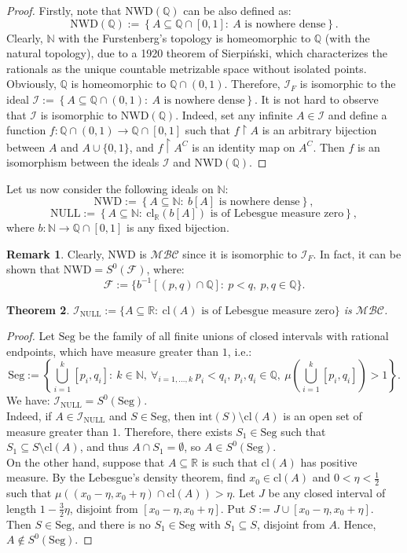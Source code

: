 \documentclass{amsart}
\newtheorem{thm}{Theorem}[section]
\theoremstyle{definition}
\newtheorem{remark}[thm]{Remark}
\newcommand{\N}{{\mathbb N}}
\newcommand{\R}{{\mathbb R}}
\newcommand{\Q}{{\mathbb Q}}
\newcommand{\I}{\mathcal I}
\newcommand{\MB}{S^0}
\newcommand{\MBC}{\mathcal{MBC}}
\newcommand{\Seg}{\mathrm{Seg}}
\newcommand{\NULL}{\mathrm{NULL}}
\newcommand{\NWD}{\mathrm{NWD}}
\newcommand{\INULL}{\I_\mathrm{NULL}}
\newcommand{\cl}{\mathrm{cl}}
\newcommand{\interior}{\mathrm{int}}
\begin{document}
\begin{proof}
Firstly, note that $\NWD(\Q)$ can be also defined as:
$$\NWD(\Q) := \left\{A\subseteq\mathbb{Q}\cap [0,1] :\ A \textrm{ is nowhere dense}\right\}.$$
Clearly, $\N$ with the Furstenberg's topology is homeomorphic to $\Q$ (with the natural topology), due to a 1920 theorem of Sierpi\'nski, which characterizes the rationals as the unique countable metrizable space without isolated points. Obviously, $\Q$ is homeomorphic to $\Q\cap (0,1)$. Therefore, $\I_F$ is isomorphic to the ideal $\I := \left\{A\subseteq\Q\cap (0,1) :\ A \textrm{ is nowhere dense}\right\}$. It is not hard to observe that $\I$ is isomorphic to $\NWD(\Q)$. Indeed, set any infinite $A\in\I$ and define a function $f \colon \Q\cap (0,1) \to \Q\cap [0,1]$ such that $f\upharpoonright A$ is an arbitrary bijection between $A$ and $A\cup\{0,1\}$, and $f\upharpoonright A^C$ is an identity map on $A^C$. Then $f$ is an isomorphism between the ideals $\I$ and $\NWD(\Q)$.
\end{proof}

Let us now consider the following ideals on $\N$:
$$\NWD :=\left\{A\subseteq\N :\ b[A] \textrm{ is nowhere dense}\right\},$$
$$\NULL :=\left\{A\subseteq\N :\ \cl_\R(b[A]) \textrm{ is of Lebesgue measure zero}\right\},$$
where $b\colon\N\to\Q\cap [0,1]$ is any fixed bijection.

\begin{remark}
Clearly, $\NWD$ is $\MBC$ since it is isomorphic to $\I_F$. In fact, it can be shown that $\NWD = \MB(\mathcal{F})$, where:
$$\mathcal{F} := \{b^{-1}[(p, q)\cap\Q] :\ p < q,\ p, q \in \Q\}.$$
\end{remark}

\begin{thm}
$\INULL := \{A \subseteq\R :\ \cl(A) \textrm{ is of Lebesgue measure zero}\}$ is $\MBC$.
\end{thm}

\begin{proof}
Let $\Seg$ be the family of all finite unions of closed intervals with rational endpoints, which have measure greater than $1$, i.e.:
$$\Seg := \left\{\bigcup_{i=1}^{k}{[p_i,q_i]} :\ k\in\N,\ \forall_{i=1,\ldots,k}\ p_i<q_i,\ p_i,q_i\in\Q,\ \mu\left(\bigcup_{i=1}^{k}{[p_i,q_i]}\right)>1\right\}.$$
We have: $\INULL = \MB(\Seg)$.\\
Indeed, if $A \in \INULL$ and $S\in\Seg$, then $\interior(S) \setminus \cl(A)$ is an open set of measure greater than $1$. Therefore, there exists $S_1\in \Seg$ such that $S_1 \subseteq S \setminus \cl(A)$, and thus $A \cap S_1 =\emptyset$, so $A\in\MB(\Seg)$.\\
On the other hand, suppose that $A\subseteq \R$ is such that $\cl(A)$ has positive measure. By the Lebesgue's density theorem, find $x_0\in\cl(A)$ and $0 < \eta < \frac{1}{2}$ such that $\mu((x_0-\eta, x_0+\eta) \cap \cl(A)) > \eta$. Let $J$ be any closed interval of length $1 - \frac{3}{2}\eta$, disjoint from $[x_0-\eta, x_0+\eta]$. Put $S := J \cup [x_0-\eta, x_0+\eta]$. Then $S\in\Seg$, and there is no $S_1\in\Seg$ with $S_1 \subseteq S$, disjoint from $A$. Hence, $A\notin\MB(\Seg)$.
\end{proof}
\end{document}
